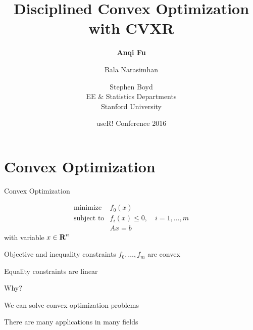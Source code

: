 \documentclass{beamer}
\title{Disciplined Convex Optimization with CVXR}
\author{\textbf{Anqi Fu} \and Bala Narasimhan \and Stephen Boyd \\[2ex]
	EE \& Statistics Departments\\[1ex]
	Stanford University}
\date{useR! Conference 2016}
\begin{document}
	
\begin{frame}
	\titlepage
\end{frame}

\begin{frame}
	\tableofcontents
\end{frame}

\section{Convex Optimization}

\begin{frame}{Convex Optimization}%
	
	\[
	\begin{array}{ll} \mbox{minimize} & f_0(x)\\
	\mbox{subject to} & f_i(x) \leq 0, \quad i=1, \ldots, m\\
	& Ax=b
	\end{array}
	\]
	with variable $x \in {\mbox{\bf R}}^n$
	
	\BIT
		\item Objective and inequality constraints $f_0, \ldots, f_m$ are convex %
		\item Equality constraints are linear
	\EIT
	\pause
	
	\vfill
	Why?
	\BIT
		\item We can solve convex optimization problems
		\item There are many applications in many fields
	\EIT
	
\end{frame}

\end{document}
